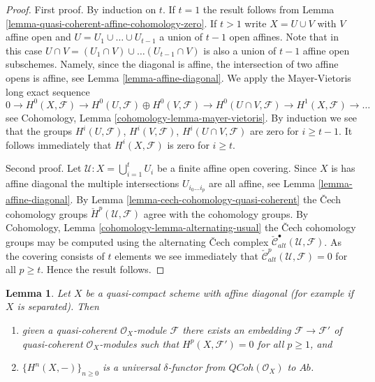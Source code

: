 \documentclass{stacks-project}
\theoremstyle{plain}
\newtheorem{lemma}[subsection]{Lemma}
\theoremstyle{definition}
\theoremstyle{remark}
\numberwithin{equation}{subsection}
\def\QCoh{\mathit{QCoh}}
\begin{document}
\begin{proof}
First proof.
By induction on $t$.
If $t = 1$ the result follows from
Lemma \ref{lemma-quasi-coherent-affine-cohomology-zero}.
If $t > 1$ write $X = U \cup V$ with $V$ affine open and
$U = U_1 \cup \ldots \cup U_{t - 1}$ a union of $t - 1$ open affines.
Note that in this case
$U \cap V =  (U_1 \cap V) \cup \ldots (U_{t - 1} \cap V)$
is also a union of $t - 1$ affine open subschemes.
Namely, since the diagonal is affine, the intersection of two
affine opens is affine, see Lemma \ref{lemma-affine-diagonal}.
We apply the Mayer-Vietoris long exact sequence
$$
0 \to
H^0(X, \mathcal{F}) \to
H^0(U, \mathcal{F}) \oplus H^0(V, \mathcal{F}) \to
H^0(U \cap V, \mathcal{F}) \to
H^1(X, \mathcal{F}) \to \ldots
$$
see Cohomology, Lemma \ref{cohomology-lemma-mayer-vietoris}.
By induction we see that the groups $H^i(U, \mathcal{F})$,
$H^i(V, \mathcal{F})$, $H^i(U \cap V, \mathcal{F})$ are zero for
$i \geq t - 1$. It follows immediately that $H^i(X, \mathcal{F})$
is zero for $i \geq t$.

\medskip\noindent
Second proof.
Let $\mathcal{U} : X = \bigcup_{i = 1}^t U_i$ be a finite affine open
covering. Since $X$ is has affine diagonal the multiple intersections
$U_{i_0 \ldots i_p}$ are all affine, see
Lemma \ref{lemma-affine-diagonal}.
By Lemma \ref{lemma-cech-cohomology-quasi-coherent} the {\v C}ech
cohomology groups $\check{H}^p(\mathcal{U}, \mathcal{F})$
agree with the cohomology groups. By
Cohomology, Lemma \ref{cohomology-lemma-alternating-usual}
the {\v C}ech cohomology groups may be computed using the alternating
{\v C}ech complex $\check{\mathcal{C}}_{alt}^\bullet(\mathcal{U}, \mathcal{F})$.
As the covering consists of $t$ elements we see immediately
that $\check{\mathcal{C}}_{alt}^p(\mathcal{U}, \mathcal{F}) = 0$
for all $p \geq t$. Hence the result follows.
\end{proof}

\begin{lemma}
\label{lemma-affine-diagonal-universal-delta-functor}
Let $X$ be a quasi-compact scheme with affine diagonal
(for example if $X$ is separated). Then
\begin{enumerate}
\item given a quasi-coherent $\mathcal{O}_X$-module $\mathcal{F}$
there exists an embedding $\mathcal{F} \to \mathcal{F}'$ of
quasi-coherent $\mathcal{O}_X$-modules
such that $H^p(X, \mathcal{F}') = 0$ for all $p \geq 1$, and
\item $\{H^n(X, -)\}_{n \geq 0}$
is a universal $\delta$-functor from $\QCoh(\mathcal{O}_X)$ to
$\textit{Ab}$.
\end{enumerate}
\end{lemma}
\end{document}
